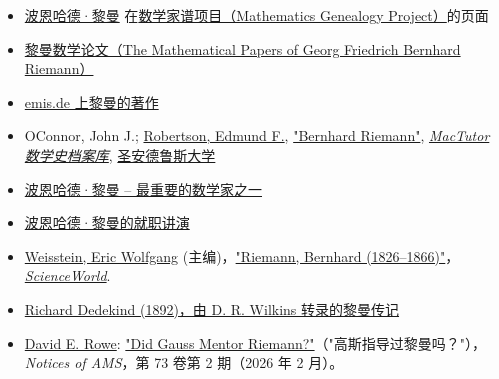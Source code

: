 \begin{itemize}
\tightlist
\item
  {\href{https://mathgenealogy.org/id.php?id=18232}{波恩哈德·黎曼} 在\href{https://en.wikipedia.org/wiki/Mathematics_Genealogy_Project}{数学家谱项目（Mathematics Genealogy Project）}的页面}
\item
  {\href{http://www.maths.tcd.ie/pub/HistMath/People/Riemann/Papers.html}{黎曼数学论文（The Mathematical Papers of Georg Friedrich Bernhard Riemann）}}
\item
  {\href{http://www.emis.de/classics/Riemann/}{emis.de 上黎曼的著作}}
\item
  {O\textquotesingle Connor, John J.; \href{https://en.wikipedia.org/wiki/Edmund_F._Robertson}{Robertson, Edmund F.}, \href{https://mathshistory.st-andrews.ac.uk/Biographies/Riemann.html}{"Bernhard Riemann"}, \emph{\href{https://en.wikipedia.org/wiki/MacTutor_History_of_Mathematics_Archive}{MacTutor 数学史档案库}}, \href{https://en.wikipedia.org/wiki/University_of_St_Andrews}{圣安德鲁斯大学}}
\item
  {\href{https://web.archive.org/web/20050903035028/http://www.fh-lueneburg.de/u1/gym03/englpage/chronik/riemann/riemann.htm}{波恩哈德·黎曼 -- 最重要的数学家之一}}
\item
  {\href{https://web.archive.org/web/20160318034045/http://www.maths.tcd.ie/pub/HistMath/People/Riemann/Geom/}{波恩哈德·黎曼的就职讲演}}
\item
  {\href{https://en.wikipedia.org/wiki/Eric_W._Weisstein}{Weisstein, Eric Wolfgang} (主编)，\href{http://scienceworld.wolfram.com/biography/Riemann.html}{"Riemann, Bernhard (1826--1866)"}，\emph{\href{https://en.wikipedia.org/wiki/ScienceWorld}{ScienceWorld}}.}
\item
  {\href{https://www.maths.tcd.ie/pub/HistMath/People/Riemann/Leben/Leben.pdf}{Richard Dedekind (1892)，由 D. R. Wilkins 转录的黎曼传记}}
\item
  {\href{https://en.wikipedia.org/wiki/David_E._Rowe}{David E. Rowe}: \href{https://www.ams.org/journals/notices/202602/noti3294/noti3294.html}{"Did Gauss Mentor Riemann?"}（"高斯指导过黎曼吗？"），\emph{Notices of AMS}，第 73 卷第 2 期（2026 年 2 月）。}
\end{itemize}




{}
